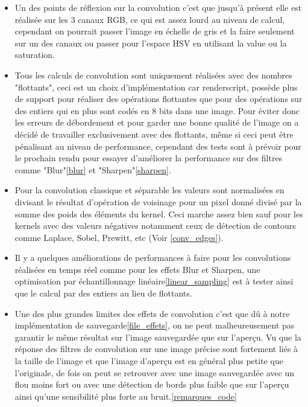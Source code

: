        
        \begin{itemize}
            \item {Un des points de réflexion sur la convolution c'est que jusqu'à présent elle est réalisée sur les 3 canaux RGB, ce qui est assez lourd au niveau de calcul,
            cependant on pourrait passer l'image en échelle de gris et la faire seulement sur un des canaux ou passer pour l'espace HSV en utilisant la value ou la saturation.}
            \item {Tous les calculs de convolution sont uniquement réalisées avec des nombres "flottants", ceci est un choix d'implémentation car renderscript, possède plus de support
            pour réaliser des opérations flottantes que pour des opérations sur des entiers qui en plus sont codés en 8 bits dans une image. Pour éviter donc les erreurs de débordement et pour garder une bonne qualité de l'image
            on a décidé de travailler exclusivement avec des flottants, même si ceci peut être pénalisant au niveau de performance, cependant des tests sont à prévoir pour le prochain rendu pour essayer
            d'améliorer la performance sur des filtres comme "Blur"\ref{blur} et "Sharpen"\ref{sharpen}.}
            \item {Pour la convolution classique et séparable les valeurs sont normalisées en divisant le résultat d'opération de voisinage pour un pixel donné
            divisé par la somme des poids des éléments du kernel. Ceci marche assez bien sauf pour les kernels avec des valeurs négatives notamment ceux de détection de contours comme Laplace, Sobel, Prewitt, etc (Voir \ref{conv_edges}).
            }

            \item {Il y a quelques améliorations de performances à faire pour les convolutions réalisées en temps réel comme pour les effets Blur et Sharpen, une optimisation par échantillonnage linéaire\ref{linear_sampling}
            est à tester ainsi que le calcul par des entiers au lieu de flottants.}

            \item {Une des plus grandes limites des effets de convolution c'est que dû à notre implémentation de sauvegarde\ref{file_effets}, on ne peut malheureusement pas garantir le même résultat sur l'image sauvegardée que sur l'aperçu.
            Vu que la réponse des filtres de convolution sur une image précise sont fortement liés à la taille de l’image et que l'image d'aperçu est en général plus petite que l'originale, de fois on peut se retrouver avec une image sauvegardée avec un flou moins fort ou avec une détection de bords plus faible que sur l'aperçu
            ainsi qu'une sensibilité plus forte au bruit.\ref{remarques_code}}
        \end{itemize} 





        
